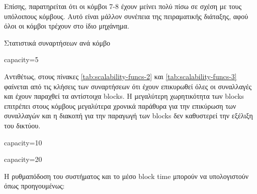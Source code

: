 \documentclass{article}
\newcommand{\eng}[1]{\foreignlanguage{english}{#1}} %
\begin{document}
Επίσης, παρατηρείται ότι οι κόμβοι 7-8 έχουν μείνει πολύ πίσω σε σχέση
με τους υπόλοιπους κόμβους. Αυτό είναι μάλλον συνέπεια της πειραματικής
διάταξης, αφού όλοι οι κόμβοι τρέχουν στο ίδιο μηχάνημα.

\begin{table}[ht]
    \caption{Στατιστικά συναρτήσεων ανά κόμβο}
    \label{tab:scalability-funcs}
    \begin{subtable}{\textwidth}
        \centering
        \caption{\eng{capacity=5}}
        \label{tab:scalability-funcs-1}
    \end{subtable}
\end{table}

Αντιθέτως, στους πίνακες \ref{tab:scalability-funcs-2} και \ref{tab:scalability-funcs-3}
φαίνεται από τις κλήσεις των συναρτήσεων ότι έχουν επικυρωθεί όλες οι συναλλαγές
και έχουν παραχθεί τα αντίστοιχα \eng{blocks}. Η μεγαλύτερη χωρητικότητα των
\eng{blocks} επιτρέπει στους κόμβους μεγαλύτερα χρονικά παράθυρα για την
επικύρωση των συναλλαγών και η διακοπή για την παραγωγή των \eng{blocks} δεν
καθυστερεί την εξέλιξη του δικτύου.

\begin{table}[ht]
    \ContinuedFloat
    \begin{subtable}{0.45\textwidth}
        \centering
        \caption{\eng{capacity=10}}
        \label{tab:scalability-funcs-2}
    \end{subtable}
    \hfill
    \begin{subtable}{0.45\textwidth}
        \centering
        \caption{\eng{capacity=20}}
        \label{tab:scalability-funcs-3}
    \end{subtable}
\end{table}

Η ρυθμαπόδοση του συστήματος και το μέσο \eng{block time} μπορούν να υπολογιστούν όπως
προηγουμένως:
\end{document}
